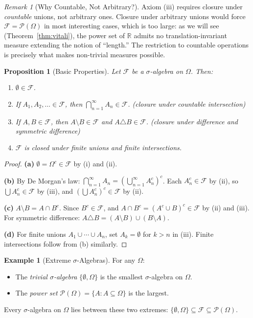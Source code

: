 \documentclass[11pt,a4paper]{article}
\theoremstyle{definition}
\newtheorem{example}{Example}[section]
\theoremstyle{plain}
\newtheorem{proposition}[theorem]{Proposition}
\theoremstyle{remark}
\newtheorem{remark}{Remark}[section]
\newcommand{\R}{\mathbb{R}}
\newcommand{\powerset}{\mathcal{P}}
\begin{document}
\begin{remark}[Why Countable, Not Arbitrary?]
\label{rem:countable}
Axiom (iii) requires closure under \emph{countable} unions, not arbitrary ones.
Closure under arbitrary unions would force $\mathcal{F} = \powerset(\Omega)$ in
most interesting cases, which is too large: as we will see
(Theorem~\ref{thm:vitali}), the power set of $\R$ admits no translation-invariant
measure extending the notion of ``length.'' The restriction to countable operations
is precisely what makes non-trivial measures possible.
\end{remark}

\begin{proposition}[Basic Properties]
\label{prop:sigma_basic}
Let $\mathcal{F}$ be a $\sigma$-algebra on $\Omega$. Then:
\begin{enumerate}[nosep,label=(\alph*)]
    \item $\emptyset \in \mathcal{F}$.
    \item If $A_1, A_2, \ldots \in \mathcal{F}$, then $\bigcap_{n=1}^\infty A_n \in \mathcal{F}$.
    \hfill(closure under countable intersection)
    \item If $A, B \in \mathcal{F}$, then $A \setminus B \in \mathcal{F}$ and $A \triangle B \in \mathcal{F}$.
    \hfill(closure under difference and symmetric difference)
    \item $\mathcal{F}$ is closed under finite unions and finite intersections.
\end{enumerate}
\end{proposition}

\begin{proof}
\textbf{(a)} $\emptyset = \Omega^c \in \mathcal{F}$ by (i) and (ii).

\textbf{(b)} By De Morgan's law: $\bigcap_{n=1}^\infty A_n = \left(\bigcup_{n=1}^\infty A_n^c\right)^c$.
Each $A_n^c \in \mathcal{F}$ by (ii), so $\bigcup A_n^c \in \mathcal{F}$ by (iii),
and $\left(\bigcup A_n^c\right)^c \in \mathcal{F}$ by (ii).

\textbf{(c)} $A \setminus B = A \cap B^c$. Since $B^c \in \mathcal{F}$, and $A \cap B^c = (A^c \cup B)^c \in \mathcal{F}$ by (ii) and (iii). For symmetric difference: $A \triangle B = (A \setminus B) \cup (B \setminus A)$.

\textbf{(d)} For finite unions $A_1 \cup \cdots \cup A_n$, set $A_k = \emptyset$ for $k > n$
in (iii). Finite intersections follow from (b) similarly.
\end{proof}

\begin{example}[Extreme $\sigma$-Algebras]
\label{ex:extreme}
For any $\Omega$:
\begin{itemize}[nosep]
    \item The \emph{trivial $\sigma$-algebra} $\{\emptyset, \Omega\}$ is the smallest $\sigma$-algebra on $\Omega$.
    \item The \emph{power set} $\powerset(\Omega) = \{A : A \subseteq \Omega\}$ is the largest.
\end{itemize}
Every $\sigma$-algebra on $\Omega$ lies between these two extremes:
$\{\emptyset, \Omega\} \subseteq \mathcal{F} \subseteq \powerset(\Omega)$.
\end{example}
\end{document}
